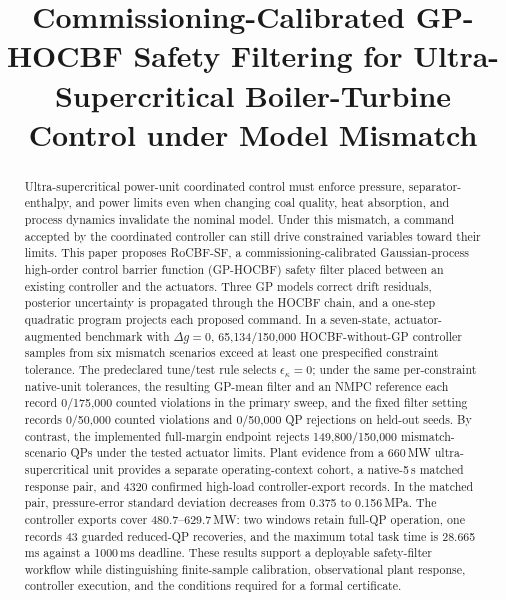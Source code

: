 \documentclass[12pt,a4paper]{article}
\begin{document}
\date{}
\title{Commissioning-Calibrated GP-HOCBF Safety Filtering for Ultra-Supercritical Boiler-Turbine Control under Model Mismatch}

\author{}

\maketitle

\begin{abstract}
Ultra-supercritical power-unit coordinated control must enforce pressure, separator-enthalpy, and power limits even when changing coal quality, heat absorption, and process dynamics invalidate the nominal model. Under this mismatch, a command accepted by the coordinated controller can still drive constrained variables toward their limits. This paper proposes RoCBF-SF, a commissioning-calibrated Gaussian-process high-order control barrier function (GP-HOCBF) safety filter placed between an existing controller and the actuators. Three GP models correct drift residuals, posterior uncertainty is propagated through the HOCBF chain, and a one-step quadratic program projects each proposed command. In a seven-state, actuator-augmented benchmark with $\Delta g=0$, 65{,}134/150{,}000 HOCBF-without-GP controller samples from six mismatch scenarios exceed at least one prespecified constraint tolerance. The predeclared tune/test rule selects $\epsilon_\kappa=0$; under the same per-constraint native-unit tolerances, the resulting GP-mean filter and an NMPC reference each record 0/175{,}000 counted violations in the primary sweep, and the fixed filter setting records 0/50{,}000 counted violations and 0/50{,}000 QP rejections on held-out seeds. By contrast, the implemented full-margin endpoint rejects 149{,}800/150{,}000 mismatch-scenario QPs under the tested actuator limits. Plant evidence from a 660\,MW ultra-supercritical unit provides a separate operating-context cohort, a native-5\,s matched response pair, and 4320 confirmed high-load controller-export records. In the matched pair, pressure-error standard deviation decreases from 0.375 to 0.156\,MPa. The controller exports cover 480.7--629.7\,MW: two windows retain full-QP operation, one records 43 guarded reduced-QP recoveries, and the maximum total task time is 28.665\,ms against a 1000\,ms deadline. These results support a deployable safety-filter workflow while distinguishing finite-sample calibration, observational plant response, controller execution, and the conditions required for a formal certificate.
\end{abstract}
\end{document}
